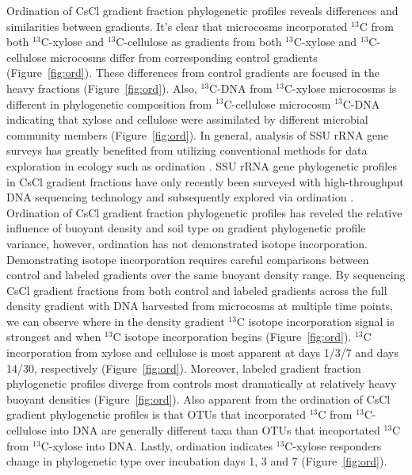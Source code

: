 Ordination of CsCl gradient fraction phylogenetic profiles reveals differences
and similarities between gradients. It's clear that microcosms incorporated
$^{13}$C from both $^{13}$C-xylose and $^{13}$C-cellulose as gradients from
both $^{13}$C-xylose and $^{13}$C-cellulose microcosms differ from
corresponding control gradients (Figure~\ref{fig:ord}). These differences from
control gradients are focused in the heavy fractions (Figure~\ref{fig:ord}).
Also, $^{13}$C-DNA from $^{13}$C-xylose microcosms is different in phylogenetic
composition from $^{13}$C-cellulose microcosm $^{13}$C-DNA indicating that
xylose and cellulose were assimilated by different microbial community members
(Figure~\ref{fig:ord}). In general, analysis of SSU rRNA gene surveys has
greatly benefited from utilizing conventional methods for data exploration
in ecology such as ordination \citep{Lozupone_2008}.  SSU rRNA gene
phylogenetic profiles in CsCl gradient fractions have only recently been
surveyed with high-throughput DNA sequencing technology and subsequently
explored via ordination \citep{Angel_2013, Verastegui_2014}. Ordination of CsCl
gradient fraction phylogenetic profiles has reveled the relative influence of
buoyant density and soil type on gradient phylogenetic profile variance, 
however, ordination has not demonstrated isotope incorporation.  Demonstrating
isotope incorporation requires careful comparisons between control and labeled
gradients over the same buoyant density range. By sequencing CsCl gradient
fractions from both control and labeled gradients across the full density
gradient with DNA harvested from microcosms at multiple time points, we can
observe where in the density gradient $^{13}$C isotope incorporation signal is
strongest and when $^{13}$C isotope incorporation begins (Figure~\ref{fig:ord}).
$^{13}$C incorporation from xylose and cellulose is most apparent at days 1/3/7
and days 14/30, respectively (Figure~\ref{fig:ord}). Moreover, labeled gradient
fraction phylogenetic profiles diverge from controls most dramatically at
relatively heavy buoyant densities (Figure~\ref{fig:ord}). Also apparent from
the ordination of CsCl gradient phylogenetic profiles is that OTUs that incorporated
$^{13}$C from $^{13}$C-cellulose into DNA are generally different taxa than OTUs that
incoportated $^{13}$C from $^{13}$C-xylose into DNA. Lastly, ordination indicates
$^{13}$C-xylose responders change in phylogenetic type over incubation days 1, 3 
and 7 (Figure~\ref{fig:ord}).

